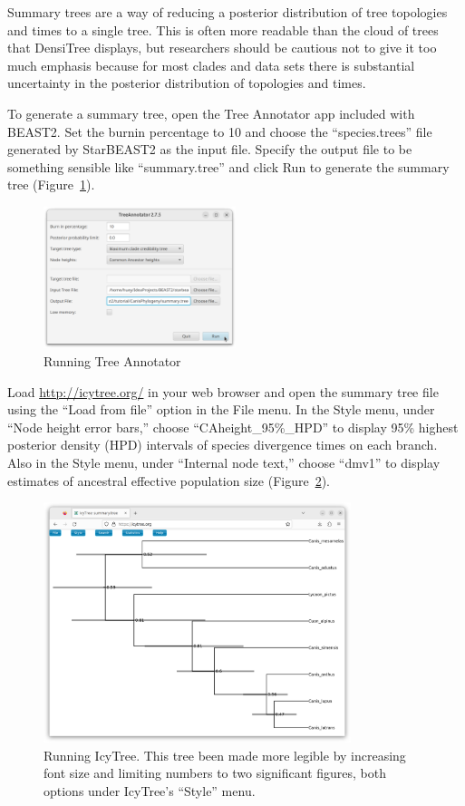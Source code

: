 \documentclass[12pt]{article}
\begin{document}
Summary trees are a way of reducing a posterior distribution of tree
topologies and times to a single tree. This is often more readable than the
cloud of trees that DensiTree displays, but researchers should be cautious not
to give it too much emphasis because for most clades and data
sets there is substantial uncertainty in the posterior distribution of
topologies and times.

To generate a summary tree, open the Tree Annotator app included with BEAST2.
Set the burnin percentage to 10 and choose the ``species.trees'' file generated by
StarBEAST2 as the input file. Specify the output file to be something sensible
like ``summary.tree'' and click Run to generate the summary tree
(Figure~\ref{fig:treeAnnotator}).

\begin{figure}[htb!]
\centering
\includegraphics[width=0.5\textwidth]{figures/treeAnnotator.png}
\caption
{Running Tree Annotator}
\label{fig:treeAnnotator}
\end{figure}

Load \url{http://icytree.org/} in your web browser and open the summary tree file using the ``Load from file'' option in the File menu. In the Style menu, under ``Node height error bars,'' choose ``CAheight\_95\%\_HPD'' to display 95\% highest posterior density (HPD) intervals of species divergence times on each branch. Also in the Style menu, under ``Internal node text,'' choose ``dmv1'' to display estimates of ancestral effective population size (Figure~\ref{fig:icytree}).

\begin{figure}[htb!]
\centering
\includegraphics[width=0.8\textwidth]{figures/icytree.png}
\caption
{Running IcyTree. This tree been made more legible by increasing font size and limiting numbers to two significant figures, both options under IcyTree's ``Style'' menu.}
\label{fig:icytree}
\end{figure}
\end{document}
